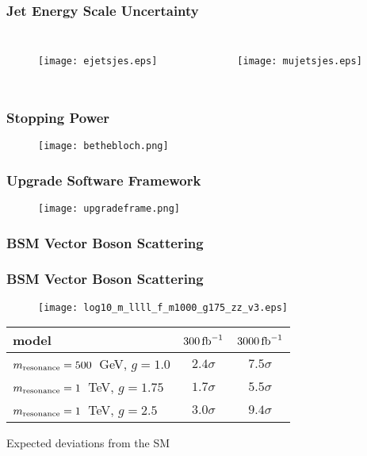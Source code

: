 \begin{frame}[noframenumbering,label=boostedjes]
    \frametitle{Jet Energy Scale Uncertainty}
    \centering
\begin{columns}
\begin{figure}
\centering
\texttt{[image: ejetsjes.eps]}
\end{figure}
\begin{figure}
\centering
\texttt{[image: mujetsjes.eps]}
\end{figure}
\end{columns}
\end{frame}

\begin{frame}[noframenumbering,label=bethebloch]
    \frametitle{Stopping Power}
\begin{figure}
\centering
\texttt{[image: bethebloch.png]}
\end{figure}
\end{frame}

\begin{frame}[noframenumbering]
    \frametitle{Upgrade Software Framework}
\begin{figure}
\centering
\texttt{[image: upgradeframe.png]}
\end{figure}
\end{frame}


\subsubsection*{BSM Vector Boson Scattering}

\begin{frame}[noframenumbering]
    \frametitle{BSM Vector Boson Scattering}
    \centering
\begin{figure}
\texttt{[image: log10\_m\_llll\_f\_m1000\_g175\_zz\_v3.eps]}
\end{figure}

\begin{tabular}{lcc} \hline  model              & $300\,{\rm fb}^{-1}$  & $3000\,{\rm fb}^{-1}$  \\ 
\hline $m_{\rm resonance} = 500$~GeV, $g = 1.0$ &  $ 2.4 \sigma$  & $7.5 \sigma$  \\ 
\hline $m_{\rm resonance} = 1$~TeV, $g = 1.75$ &  $ 1.7 \sigma$  & $5.5 \sigma$  \\ 
\hline $m_{\rm resonance} = 1$~TeV, $g = 2.5$ &  $ 3.0 \sigma$  & $9.4 \sigma$  \\ 
\hline \hline
\end{tabular}

\vspace{10pt}

Expected deviations from the SM
\end{frame}

